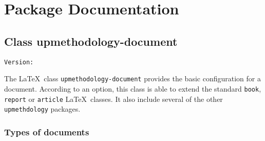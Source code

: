 \documentclass[book,taskpackage,specpackage,codepackage]{upmethodology-document}
\makeatletter
\let\VERdocclazz\upm@package@docclazz@ver
\makeatother
\begin{document}
\part{Package Documentation}

\chapter{Class upmethodology-document}

\begin{center}
	\texttt{Version: \VERdocclazz}
\end{center}

The \LaTeX\ class \texttt{upmethodology-document} provides the basic configuration for a document. According to an option, this class is able to extend the standard \texttt{book}, \texttt{report} or \texttt{article} \LaTeX\ classes. It also include several of the other \texttt{upmethdology} packages.

\section{Types of documents}\label{section:documentclass:doctype}
\end{document}
